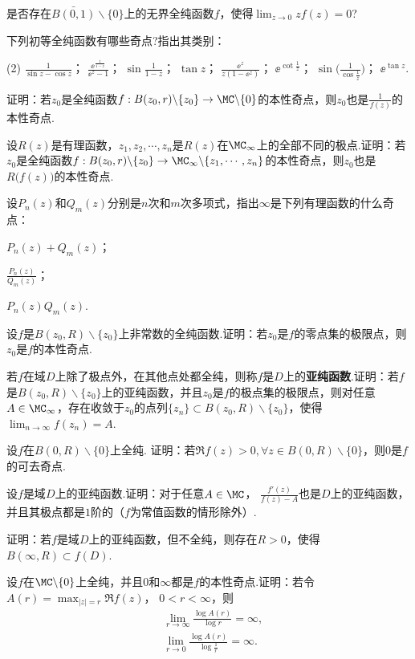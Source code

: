 \begin{xiti}
\item 是否存在$\bar{B(0,1)}\backslash\{0\}$上的无界全纯函数$f$，使得$\lim_{z\to0}zf(z)=0$?
\item 下列初等全纯函数有哪些奇点?指出其类别：
\begin{tasks}(2)
\task $\frac1{\sin z-\cos z}$；
\task $\frac{\ee^{\frac1{1-z}}}{\ee^z-1}$；
\task $\sin\frac1{1-z}$；
\task $\tan z$；
\task $\frac{\ee^z}{z(1-\ee^z)}$；
\task $\ee^{\cot\frac1z}$；
\task $\sin\bigg(\frac1{\cos\frac1z}\bigg)$；
\task $\ee^{\tan z}$.
\end{tasks}
\item 证明：若$z_0$是全纯函数$f:B(z_0,r)\backslash\{z_0\}\to\MC\backslash\{0\}$的本性奇点，则$z_0$也是$\frac1{f(z)}$的本性奇点.
\item 设$R(z)$是有理函数，$z_1,z_2,\cdots,z_n$是$R(z)$在$\MC_\infty$上的全部不同的极点.证明：若$z_0$是全纯函数$f:B(z_0,r)\backslash\{z_0\}\to\MC_\infty\backslash
    \{z_1,\cdots,z_n\}$的本性奇点，则$z_0$也是$R\big(f(z)\big)$的本性奇点.
\item 设$P_n(z)$和$Q_m(z)$分别是$n$次和$m$次多项式，指出$\infty$是下列有理函数的什么奇点：
\begin{enuma}
  \item $P_n(z)+Q_m(z)$；
  \item $\frac{P_n(z)}{Q_m(z)}$；
  \item $P_n(z)Q_m(z)$.
\end{enuma}
\item 设$f$是$B(z_0,R)\backslash\{z_0\}$上非常数的全纯函数.证明：若$z_0$是$f$的零点集的极限点，则$z_0$是$f$的本性奇点.
\item 若$f$在域$D$上除了极点外，在其他点处都全纯，则称$f$是$D$上的\textbf{亚纯函数}.证明：若$f$是$B(z_0,R)\backslash\{z_0\}$上的亚纯函数，并且$z_0$是$f$的极点集的极限点，则对任意$A\in \MC_\infty$，存在收敛于$z_0$的点列$\{z_n\}\subset B(z_0,R)\backslash\{z_0\}$，使得$\lim_{n\to\infty}f(z_n)=A$.
\item 设$f$在$B(0,R)\backslash\{0\}$上全纯. 证明：若$\Re f(z)>0,\forall z\in B(0,R)\backslash\{0\}$，则$0$是$f$的可去奇点.
\item 设$f$是域$D$上的亚纯函数.证明：对于任意$A\in \MC$，
$\frac{f'(z)}{f(z)-A}$也是$D$上的亚纯函数，并且其极点都是$1$阶的（$f$为常值函数的情形除外）.
\item 证明：若$f$是域$D$上的亚纯函数，但不全纯，则存在$R>0$，使得$B(\infty,R)\subset f(D)$.
\item 设$f$在$\MC\backslash\{0\}$上全纯，并且$0$和$\infty$都是$f$的本性奇点.证明：若令$A(r)=\max_{|z|=r}\Re f(z)$， $0<r<\infty$，则
    \begin{align*}
    &\lim_{r\to\infty}\frac{\log A(r)}{\log r}=\infty,\\
    &\lim_{r\to0}\frac{\log A(r)}{\log\frac1r}=\infty.
    \end{align*}
\end{xiti}

